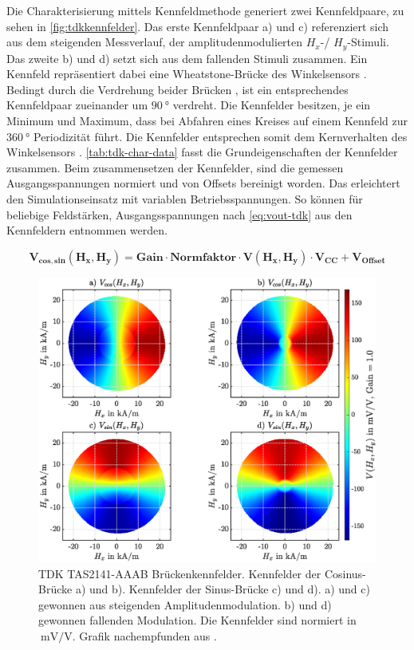 Die Charakterisierung mittels Kennfeldmethode generiert zwei Kennfeldpaare, zu sehen in \autoref{fig:tdkkennfelder}. 
Das erste Kennfeldpaar a) und c) referenziert sich aus dem steigenden Messverlauf, der amplitudenmodulierten 
$H_x$-/ $H_y$-Stimuli. Das zweite b) und d) setzt sich aus dem fallenden Stimuli zusammen. Ein Kennfeld repräsentiert 
dabei eine Wheatstone-Brücke des Winkelsensors \cite{Schuethe2019}. Bedingt durch die Verdrehung beider Brücken 
\cite{TDK2016}, ist ein entsprechendes Kennfeldpaar zueinander um $\SI{90}{\degree}$ verdreht.
Die Kennfelder besitzen, je ein Minimum und Maximum, dass bei Abfahren eines Kreises auf einem Kennfeld zur 
$\SI{360}{\degree}$ Periodizität führt. Die Kennfelder entsprechen somit dem Kernverhalten des Winkelsensors 
\cite{TDK2016}. \autoref{tab:tdk-char-data} fasst die Grundeigenschaften der Kennfelder zusammen. Beim zusammensetzen 
der Kennfelder, sind die gemessen Ausgangsspannungen normiert und von Offsets bereinigt worden. Das erleichtert den 
Simulationseinsatz mit variablen Betriebsspannungen. So können für beliebige Feldstärken, Ausgangsspannungen nach 
\autoref{eq:vout-tdk} aus den Kennfeldern entnommen werden.


\begin{equation}\label{eq:vout-tdk}
	\mathbf{V_{cos,sin}(H_x,H_y) = Gain \cdot Normfaktor \cdot V(H_x,H_y) \cdot V_{CC} + V_{Offset}}
\end{equation}


\begin{figure}[bph]
	\centering
	\includegraphics[width=.95\linewidth]{appendix/images/3-TDK/TDK_Kennfelder}
	\caption[TDK TAS2141-AAAB Brückenkennfelder]{TDK TAS2141-AAAB Brückenkennfelder. Kennfelder der Cosinus-Brücke a) 
		und b). Kennfelder der Sinus-Brücke c) und d). a) und c) gewonnen aus steigenden Amplitudenmodulation. b) und 
		d) gewonnen fallenden Modulation. Die Kennfelder sind normiert in $\SI{}{\milli\volt\per\volt}$. Grafik 
		nachempfunden 
		aus \cite{Schuethe2019}.}
	\label{fig:tdkkennfelder}
\end{figure}


